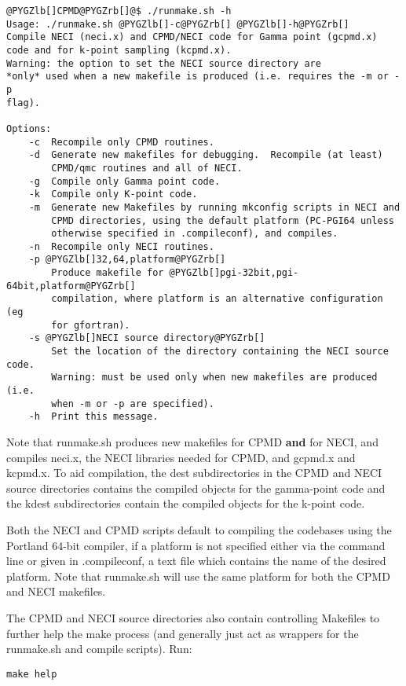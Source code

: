\documentclass[openany,a4paper,10pt,english]{manual}
\begin{document}
\begin{Verbatim}[commandchars=@\[\]]
@PYGZlb[]CPMD@PYGZrb[]@$ ./runmake.sh -h
Usage: ./runmake.sh @PYGZlb[]-c@PYGZrb[] @PYGZlb[]-h@PYGZrb[]
Compile NECI (neci.x) and CPMD/NECI code for Gamma point (gcpmd.x)
code and for k-point sampling (kcpmd.x).
Warning: the option to set the NECI source directory are
*only* used when a new makefile is produced (i.e. requires the -m or -p
flag).

Options:
    -c  Recompile only CPMD routines.
    -d  Generate new makefiles for debugging.  Recompile (at least)
        CPMD/qmc routines and all of NECI.
    -g  Compile only Gamma point code.
    -k  Compile only K-point code.
    -m  Generate new Makefiles by running mkconfig scripts in NECI and
        CPMD directories, using the default platform (PC-PGI64 unless
        otherwise specified in .compileconf), and compiles.
    -n  Recompile only NECI routines.
    -p @PYGZlb[]32,64,platform@PYGZrb[]
        Produce makefile for @PYGZlb[]pgi-32bit,pgi-64bit,platform@PYGZrb[]
        compilation, where platform is an alternative configuration (eg
        for gfortran).
    -s @PYGZlb[]NECI source directory@PYGZrb[]
        Set the location of the directory containing the NECI source code.
        Warning: must be used only when new makefiles are produced (i.e.
        when -m or -p are specified).
    -h  Print this message.
\end{Verbatim}

Note that runmake.sh produces new makefiles for CPMD \textbf{and} for NECI,
and compiles neci.x, the NECI libraries needed for CPMD, and gcpmd.x
and kcpmd.x.  To aid compilation, the dest subdirectories in the CPMD and
NECI source directories contains the compiled objects for the gamma-point
code and the kdest subdirectories contain the compiled objects for the
k-point code.

Both the NECI and CPMD scripts default to compiling the codebases using
the Portland 64-bit compiler, if a platform is not specified either via
the command line or given in .compileconf, a text file which
contains the name of the desired platform.  Note that runmake.sh will
use the same platform for both the CPMD and NECI makefiles.

The CPMD and NECI source directories also contain controlling Makefiles
to further help the make process (and generally just act as wrappers
for the runmake.sh and compile scripts).  Run:

\begin{Verbatim}[commandchars=@\[\]]
make help
\end{Verbatim}
\end{document}
